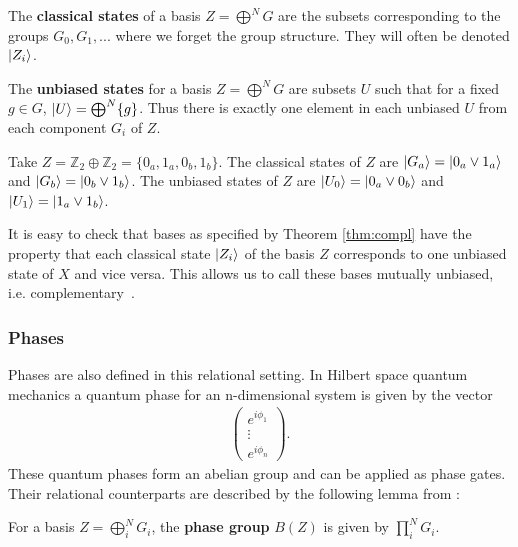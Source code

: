 \begin{corollary}
The \textbf{classical states} of a basis $Z = \bigoplus^{N}G$ are the subsets corresponding to the groups $G_0, G_1,...$ where we forget the group structure. They will often be denoted $| Z_i \rangle$.
\end{corollary}

\begin{corollary}
The \textbf{unbiased states} for a basis $Z = \bigoplus^{N}G$ are subsets $U$ such that for a fixed $g\in G$, $| U \rangle = \bigoplus^{N}\{g\}$.
Thus there is exactly one element in each unbiased $U$ from each component $G_i$ of $Z$.
\end{corollary}

\begin{example}
Take $Z = \mathbb{Z}_2\oplus\mathbb{Z}_2=\{0_a,1_a,0_b,1_b\}$. The classical states of $Z$ are $| G_a \rangle=| 0_a\vee1_a \rangle$ and $| G_b \rangle=| 0_b\vee1_b \rangle$.  The unbiased states of $Z$ are $| U_0 \rangle=| 0_a\vee0_b \rangle$ and $| U_1 \rangle=| 1_a\vee1_b \rangle$.
\end{example}

It is easy to check that bases as specified by Theorem \ref{thm:compl} have the property that each classical state $| Z_i \rangle$ of the basis $Z$ corresponds to one unbiased state of $X$ and vice versa.
This allows us to call these bases mutually unbiased, i.e. complementary~\cite{evans2009classifying}.
\subsubsection*{Phases}

Phases are also defined in this relational setting.  In Hilbert space quantum mechanics a quantum phase for an n-dimensional system is given by the vector
\begin{align*}
\left(\begin{array}{c}
e^{i\phi_1} \\
\vdots \\
e^{i\phi_n}
\end{array}
\right).
\end{align*}
These quantum phases form an abelian group and can be applied as phase gates.
Their relational counterparts are described by the following lemma from \cite{cqm-notes}:
\begin{lemma}
For a basis $Z=\bigoplus_i^NG_i$, the \textbf{phase group} $B(Z)$ is given by $\prod_i^NG_i$.
\end{lemma}

